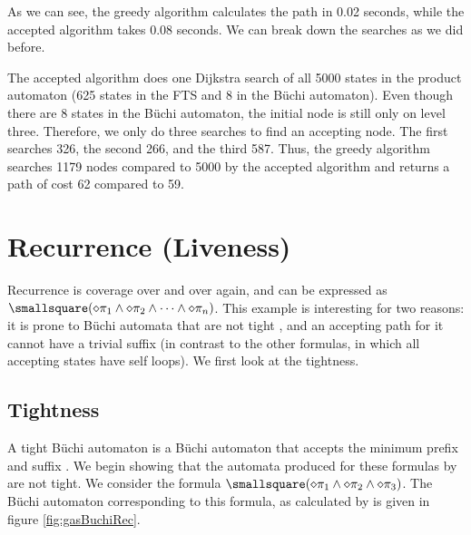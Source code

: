 As we can see, the greedy algorithm calculates the path in 0.02 seconds, while the accepted algorithm takes 0.08 seconds. We can break down the searches as we did before. 

The accepted algorithm does one Dijkstra search of all 5000 states in the product automaton (625 states in the FTS and 8 in the B\"uchi automaton). Even though there are 8 states in the B\"uchi automaton, the initial node is still only on level three. Therefore, we only do three searches to find an accepting node. The first searches 326, the second 266, and the third 587. Thus, the greedy algorithm searches 1179 nodes compared to 5000 by the accepted algorithm and returns a path of cost 62 compared to 59.

\section{Recurrence (Liveness)}
Recurrence is coverage over and over again, and can be expressed as $\smallsquare(\diamond \pi_1 \land \diamond \pi_2 \land \dots \land \diamond \pi_n)$. This example is interesting for two reasons: it is prone to B\"{u}chi automata that are not tight \cite{schuppan05}, and an accepting path for it cannot have a trivial suffix (in contrast to the other formulas, in which all accepting states have self loops). We first look at the tightness.

\subsection{Tightness}
A tight B\"uchi automaton is a B\"uchi automaton that accepts the minimum prefix and suffix \cite{schuppan05}. We begin showing that the automata produced for these formulas by \cite{ltlbuchiwebsite} are not tight. We consider the formula $\smallsquare(\diamond \pi_1 \land \diamond \pi_2 \land \diamond \pi_3)$. The B\"{u}chi automaton corresponding to this formula, as calculated by \cite{gastin01} is given in figure \ref{fig:gasBuchiRec}.

